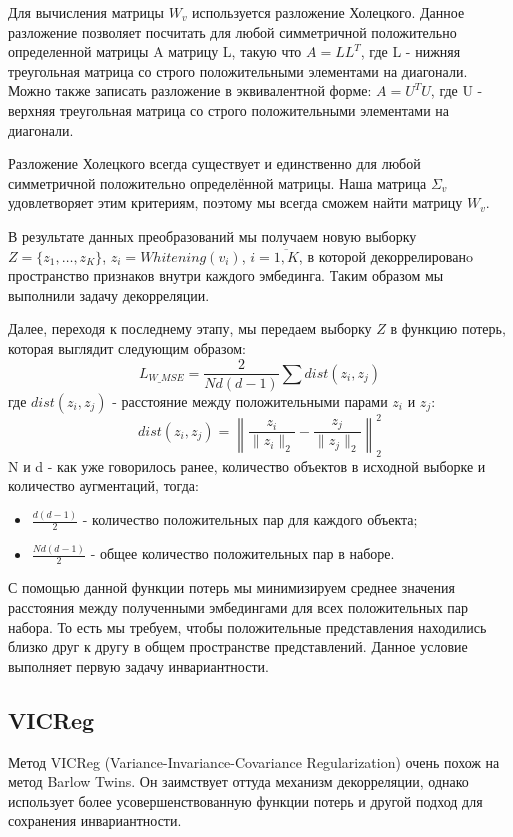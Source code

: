 Для вычисления матрицы $W_v$ используется разложение Холецкого.
Данное разложение позволяет посчитать для любой симметричной положительно определенной матрицы A матрицу L, такую что $A=LL^T$, где L - нижняя треугольная матрица со строго положительными элементами на диагонали. Можно также записать разложение в эквивалентной форме: $A=U^TU$, где U - верхняя треугольная матрица со строго положительными элементами на диагонали. 

Разложение Холецкого всегда существует и единственно для любой симметричной положительно определённой матрицы. Наша матрица $\Sigma_v$ удовлетворяет этим критериям, поэтому мы всегда сможем найти матрицу $W_v$.

В результате данных преобразований мы получаем новую выборку $Z=\{z_1, \dots, z_K\}$, $z_i=Whitening(v_i)$, $i=\overline{1,K}$, в которой декоррелированo пространство признаков внутри каждого эмбединга. Таким образом мы выполнили задачу декорреляции.

Далее, переходя к последнему этапу, мы передаем выборку $Z$ в функцию потерь, которая выглядит следующим образом:
$$
L_{W\_MSE}=\frac{2}{Nd(d-1)}\sum dist(z_i, z_j)
$$
где $dist(z_i, z_j)$ - расстояние между положительными парами $z_i$ и $z_j$:
$$
dist(z_i, z_j)=\left\|\frac{z_i}{\|z_i\|_2}-\frac{z_j}{\|z_j\|_2}\right\|_2^2
$$
N и d - как уже говорилось ранее, количество объектов в исходной выборке и количество аугментаций, тогда:
\begin{itemize}
    \item $\frac{d(d-1)}{2}$ - количество положительных пар для каждого объекта;
    \item $\frac{Nd(d-1)}{2}$ - общее количество положительных пар в наборе.
\end{itemize} 

С помощью данной функции потерь мы минимизируем среднее значения расстояния между полученными эмбедингами для всех положительных пар набора. То есть мы требуем, чтобы положительные представления находились близко друг к другу в общем пространстве представлений. Данное условие выполняет первую задачу инвариантности.

\subsection{VICReg}

Метод VICReg (Variance-Invariance-Covariance Regularization) очень похож на метод Barlow Twins. Он заимствует оттуда механизм декорреляции, однако использует более усовершенствованную функции потерь и другой подход для сохранения инвариантности.

